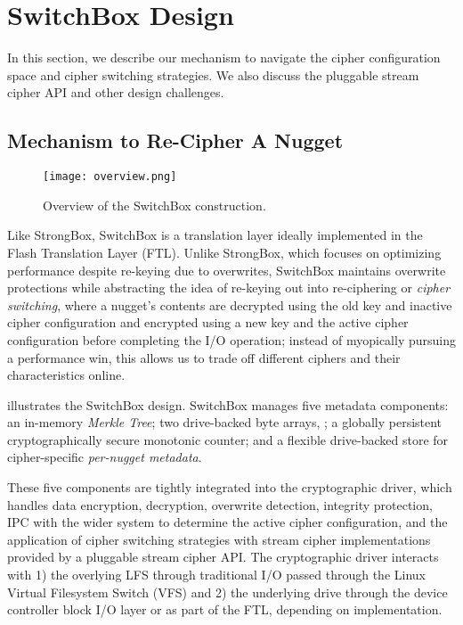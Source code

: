 \section{SwitchBox Design}\label{sec:design}


In this section, we describe our mechanism to navigate the cipher configuration
space and cipher switching strategies. We also discuss the pluggable stream
cipher API and other design challenges.

\subsection{Mechanism to Re-Cipher A Nugget}

\begin{figure}[t]
   \centering
   \texttt{[image: overview.png]}
   \caption{Overview of the SwitchBox construction.}\label{fig:overview}
\end{figure}

Like StrongBox, SwitchBox is a translation layer ideally implemented in the
Flash Translation Layer (FTL). Unlike StrongBox, which focuses on optimizing
performance despite re-keying due to overwrites, SwitchBox maintains overwrite
protections while abstracting the idea of re-keying out into re-ciphering or
\emph{cipher switching}, where a nugget's contents are decrypted using the old
key and inactive cipher configuration and encrypted using a new key and the
active cipher configuration before completing the I/O operation; instead of
myopically pursuing a performance win, this allows us to trade off different
ciphers and their characteristics online.

 illustrates the SwitchBox design. SwitchBox manages five
metadata components: an in-memory \emph{Merkle Tree}; two drive-backed byte
arrays, ; a
globally persistent cryptographically secure monotonic counter; and a flexible
drive-backed store for cipher-specific \emph{per-nugget metadata}.

These five components are tightly integrated into the cryptographic driver,
which handles data encryption, decryption, overwrite detection, integrity
protection, IPC with the wider system to determine the active cipher
configuration, and the application of cipher switching strategies with stream
cipher implementations provided by a pluggable stream cipher API. The
cryptographic driver interacts with 1) the overlying LFS through traditional I/O
passed through the Linux Virtual Filesystem Switch (VFS) and 2) the underlying
drive through the device controller block I/O layer or as part of the FTL,
depending on implementation.

